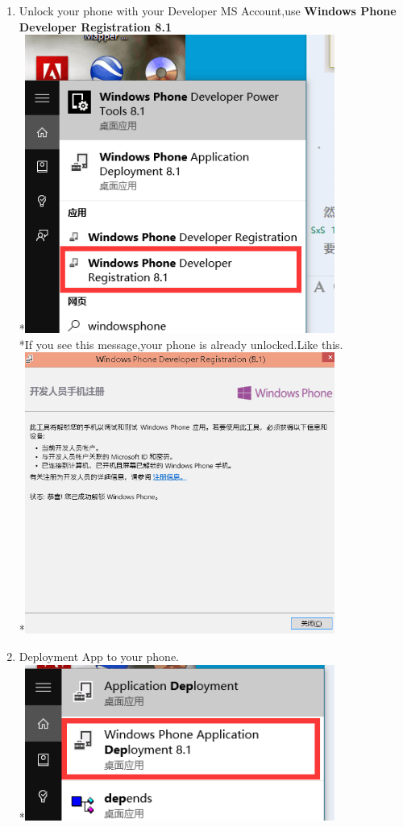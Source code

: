 \documentclass[12pt,a4paper]{article}
\begin{document}
\begin{CJK}{UTF8}{gbsn}
\begin{enumerate}
\item Unlock your phone with your Developer MS Account,use \textbf{Windows Phone Developer Registration 8.1}
\\*\includegraphics[width=4in]{install_registration_phone.png}
\\*If you see this message,your phone is already unlocked.Like this.
\\*\includegraphics[width=4in]{install_unlock_success.png}
\item Deployment App to your phone.
\\*\includegraphics[width=4in]{install_deploy.png}

\end{enumerate}
\end{CJK}
\end{document}
